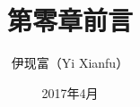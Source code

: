 



\title[前言]{第零章\quad 前言}
\author[Yixf]{伊现富（Yi Xianfu）}
\date{2017年4月}

% 



\begin{frame}
\end{frame}




